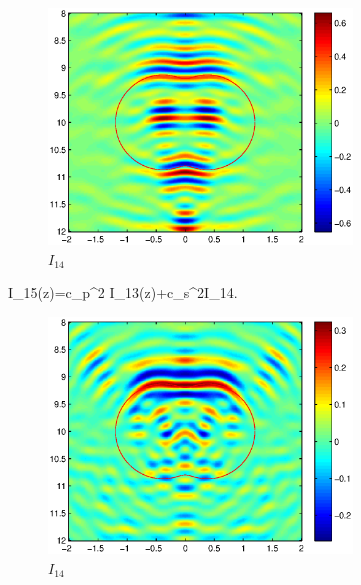 \documentclass[12pt]{iopart}
\begin{document}
\een
\begin{figure}[!h]
	\centering
	\includegraphics[width=0.72\textwidth]{./figures/ks_add_kp_scalar_e1_e1}
	\caption{$I_{14}$}\label{I14}
\end{figure}
\ben
\hskip -2cm
I_{15}(z)=c_p^2 I_{13}(z)+c_s^2I_{14}.
\een
\begin{figure}[!h]
	\centering
	\includegraphics[width=0.72\textwidth]{./figures/ks_add_kp_scalar_e1_e1_add_e2_e2}
	\caption{$I_{14}$}\label{I15}
\end{figure}
\end{document}
